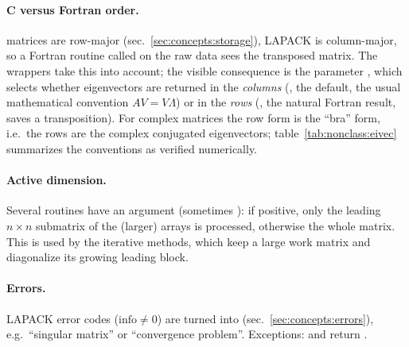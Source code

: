 \paragraph{C versus Fortran order.} \LA{} matrices are row-major (sec.~\ref{sec:concepts:storage}), LAPACK
is column-major, so a Fortran routine called on the raw data sees the transposed matrix. The wrappers
take this into account; the visible consequence is the parameter , which selects whether
eigenvectors are returned in the \emph{columns} (, the default, the usual mathematical
convention $A V = V\Lambda$) or in the \emph{rows} (, the natural Fortran result, saves a
transposition). For complex matrices the row form is the ``bra'' form, i.e.\ the rows are the complex
conjugated eigenvectors; table~\ref{tab:nonclass:eivec} summarizes the conventions as verified numerically.

\paragraph{Active dimension.} Several routines have an argument  (sometimes ): if
positive, only the leading $n\times n$ submatrix of the (larger) arrays is processed, otherwise the
whole matrix. This is used by the iterative methods, which keep a large work matrix and diagonalize its
growing leading block.

\paragraph{Errors.} LAPACK error codes ($\mathrm{info}\ne0$) are turned into 
(sec.~\ref{sec:concepts:errors}), e.g.\ ``singular matrix'' or ``convergence problem''. Exceptions:
 and  return .

